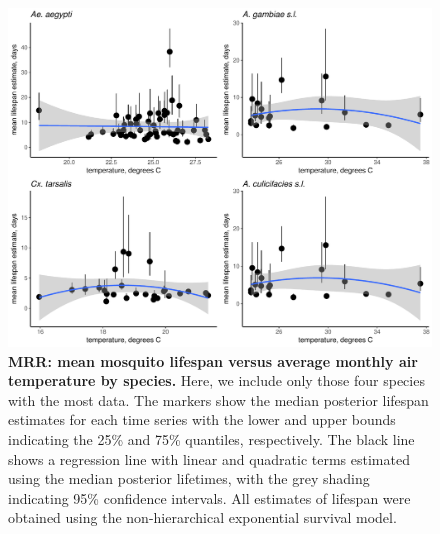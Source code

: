 \documentclass[12pt]{article}
\begin{document}
\begin{figure}[h]
	\centerline{\includegraphics[width=1\textwidth]{./Figure_files/mrr_ThreeSpeciesVersusTemperature.pdf}}
	\caption{\textbf{MRR: mean mosquito lifespan versus average monthly air temperature by species.} Here, we include only those four species with the most data. The markers show the median posterior lifespan estimates for each time series with the lower and upper bounds indicating the 25\% and 75\% quantiles, respectively. The black line shows a regression line with linear and quadratic terms estimated using the median posterior lifetimes, with the grey shading indicating 95\% confidence intervals. All estimates of lifespan were obtained using the non-hierarchical exponential survival model.}\label{fig:mrr_ThreeSpeciesVersusTemperature}
\end{figure}
\end{document}
